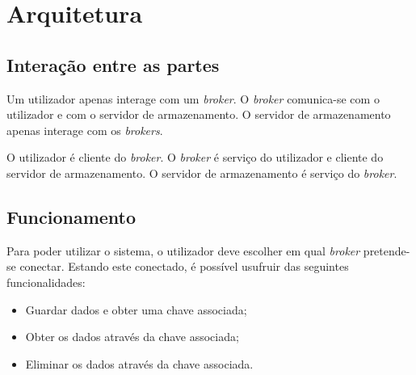 \chapter{Arquitetura}

\section{Interação entre as partes}
Um utilizador apenas interage com um \textit{broker}. O \textit{broker} comunica-se com o utilizador e com o servidor de armazenamento. O servidor de armazenamento apenas interage com os \textit{brokers}.

\begin{figure}[h]
\end{figure}

O utilizador é cliente do \textit{broker}. O \textit{broker} é serviço do utilizador e cliente do servidor de armazenamento. O servidor de armazenamento é serviço do \textit{broker}.

\section{Funcionamento}
Para poder utilizar o sistema, o utilizador deve escolher em qual \textit{broker} pretende-se conectar. Estando este conectado, é possível usufruir das seguintes funcionalidades:
\begin{itemize}
	\item Guardar dados e obter uma chave associada;
	\item Obter os dados através da chave associada;
	\item Eliminar os dados através da chave associada.
\end{itemize}

